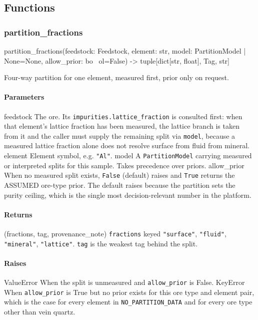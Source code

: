 \documentclass[10pt,a4paper,twoside]{report}
\begin{document}
\subsection*{Functions}

\subsubsection*{partition\_fractions}

\begin{verbatimsmall}
partition_fractions(feedstock: Feedstock, element: str, model: PartitionModel | None=None, allow_prior: bo
    \ ol=False) -> tuple[dict[str, float], Tag, str]
\end{verbatimsmall}

Four-way partition for one element, measured first, prior only on request.

\paragraph*{Parameters}

feedstock The ore. Its \texttt{impurities.lattice\_fraction} is consulted first: when that element's lattice fraction has been measured, the lattice branch is taken from it and the caller must supply the remaining split via \texttt{model}, because a measured lattice fraction alone does not resolve surface from fluid from mineral. element Element symbol, e.g. \texttt{"Al"}. model A \texttt{PartitionModel} carrying measured or interpreted splits for this sample. Takes precedence over priors. allow\_prior When no measured split exists, \texttt{False} (default) raises and \texttt{True} returns the ASSUMED ore-type prior. The default raises because the partition sets the purity ceiling, which is the single most decision-relevant number in the platform.

\paragraph*{Returns}

(fractions, tag, provenance\_note) \texttt{fractions} keyed \texttt{"surface"}, \texttt{"fluid"}, \texttt{"mineral"}, \texttt{"lattice"}. \texttt{tag} is the weakest tag behind the split.

\paragraph*{Raises}

ValueError When the split is unmeasured and \texttt{allow\_prior} is False. KeyError When \texttt{allow\_prior} is True but no prior exists for this ore type and element pair, which is the case for every element in \texttt{NO\_PARTITION\_DATA} and for every ore type other than vein quartz.
\end{document}
